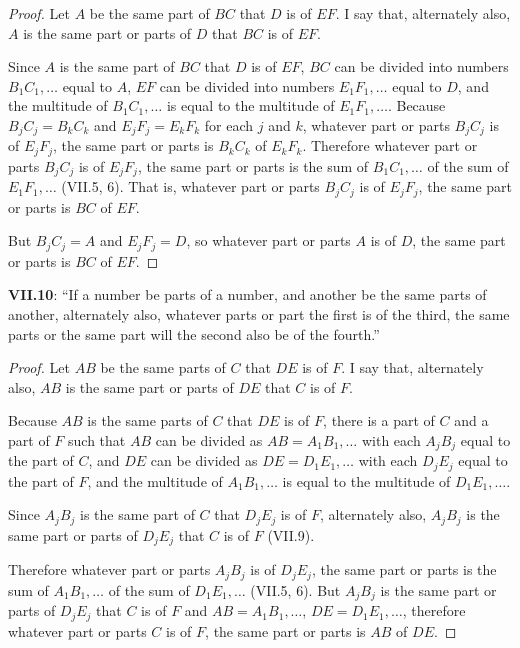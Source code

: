 \documentclass{article}
\begin{document}
\begin{proof}
Let $A$ be the same part of $BC$ that $D$ is of $EF$. I say that, alternately also, 
$A$ is the same part or parts of $D$ that $BC$ is of $EF$. 

Since $A$ is the same part of $BC$ that $D$ is of $EF$,  $BC$ can be divided into numbers
$B_1C_1,\ldots$ equal to $A$, $EF$ can be divided into numbers $E_1F_1,\ldots$ equal to $D$, and the 
multitude of $B_1C_1,\ldots$ is equal to the multitude of $E_1F_1,\ldots$. 
Because $B_jC_j=B_kC_k$ and $E_jF_j=E_kF_k$ for each $j$ and $k$,
whatever part or parts $B_jC_j$ is of $E_jF_j$, the same part or parts is $B_kC_k$ of $E_kF_k$. 
Therefore whatever part or parts $B_jC_j$ is of $E_jF_j$, the same part or parts is
the sum of $B_1C_1,\ldots$ of the sum of $E_1F_1,\ldots$ (VII.5, 6). That is, whatever part or parts $B_jC_j$ is of $E_jF_j$, the same
part or parts is $BC$ of $EF$. 

But $B_jC_j=A$ and $E_jF_j=D$, so whatever part or parts $A$ is of $D$, the same part or parts is $BC$ of $EF$.
\end{proof}


\textbf{VII.10}: ``If a number be parts of a number, and another be the same parts of another, alternately also, whatever parts or part the first is of the third, the same parts or the same part will the second also be of the fourth.''

\begin{proof}
Let $AB$ be the same parts of $C$ that $DE$ is of $F$. I say that, alternately also,
$AB$ is the same part or parts of $DE$ that $C$ is of $F$.

Because $AB$ is the same parts of $C$ that $DE$ is of $F$, there is a part of $C$ and a part of $F$ such that
$AB$ can be divided as $AB=A_1B_1,\ldots$ with each $A_jB_j$ equal to the part of $C$,
and $DE$ can be divided as $DE=D_1E_1,\ldots$ with each $D_jE_j$ equal to the part of $F$, and the multitude of
$A_1B_1,\ldots$ is equal to the multitude of $D_1E_1,\ldots$. 

Since $A_jB_j$ is the same part of $C$ that $D_jE_j$ is of $F$,
alternately also,
$A_jB_j$ is the same part or parts of $D_jE_j$ that $C$ is of $F$ (VII.9).



Therefore whatever part or parts $A_jB_j$ is of $D_jE_j$, the same part or parts is
the sum of $A_1B_1,\ldots$ of the sum of $D_1E_1,\ldots$ (VII.5, 6).
But 
$A_jB_j$ is the same part or parts of $D_jE_j$ that $C$ is of $F$ and
$AB=A_1B_1,\ldots$, $DE=D_1E_1,\ldots$, therefore
whatever part or parts $C$ is of $F$, the same part or parts is $AB$ of $DE$.
\end{proof}
\end{document}
